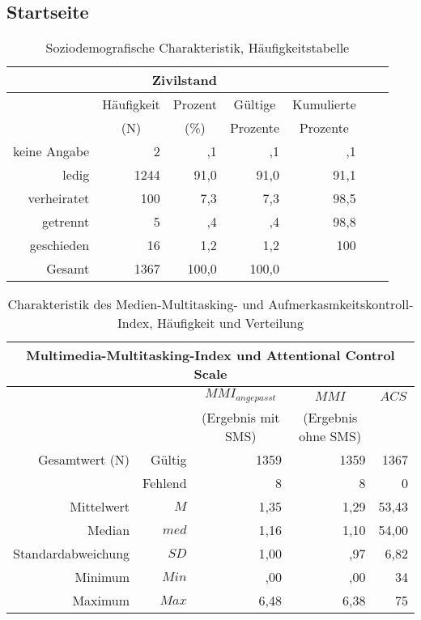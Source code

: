 \begin{RaggedRight}
\section{Startseite}\label{anhangSesction.Startseite}
\begin{table}[ht] 
    \centering
    \caption{Soziodemografische Charakteristik, Häufigkeitstabelle}
    \begin{tabular}[t]{|r|r|r|r|r|r|r|} 
        \hline
        \multicolumn{5}{|c|}{\textbf{Zivilstand}}\\ 
        \hline       
        \multicolumn{1}{|c}{} & \multicolumn{1}{c|}{Häufigkeit} & \multicolumn{1}{|c|}{Prozent} & \multicolumn{1}{|c|}{Gültige} & \multicolumn{1}{|c|}{Kumulierte}\\
        \multicolumn{1}{|c}{} & \multicolumn{1}{c|}{(N)} & \multicolumn{1}{|c|}{(\%)} & \multicolumn{1}{|c|}{Prozente} & \multicolumn{1}{|c|}{Prozente} \\
        \hline
        keine Angabe & 2 & ,1 & ,1 & ,1\\
        ledig & 1244 & 91,0 & 91,0 & 91,1\\
        verheiratet & 100 & 7,3 & 7,3 & 98,5\\
        getrennt & 5 & ,4 & ,4 & 98,8\\
        geschieden & 16 & 1,2 & 1,2 & 100\\
        Gesamt  & 1367 & 100,0 & 100,0 & \\
        \hline
    \end{tabular}
    \label{table.sozidemoZivil}
\end{table}
\begin{table}[ht] 
    \centering
    \caption{Charakteristik des Medien-Multitasking- und Aufmerkasmkeitskontroll-Index, Häufigkeit und Verteilung}
    \begin{tabular}[t]{|r r|r|r|r|} 
        \hline
        \multicolumn{5}{|c|}{\textbf{Multimedia-Multitasking-Index und Attentional Control Scale}}\\ 
        \hline       
        \multicolumn{2}{|c}{} & \multicolumn{1}{c|}{$MMI_{angepasst}$} & \multicolumn{1}{|c|}{$MMI$}& \multicolumn{1}{c|}{$ACS$}\\
        \multicolumn{2}{|c}{} & \multicolumn{1}{c|}{(Ergebnis mit SMS)} & \multicolumn{1}{|c|}{(Ergebnis ohne SMS)}& \multicolumn{1}{c|}{}\\
        \hline
        Gesamtwert (N) & Gültig & 1359 & 1359 & 1367\\
        & Fehlend & 8 & 8 & 0\\
        Mittelwert & $M$ & 1,35 & 1,29 & 53,43\\
        Median & $med$ & 1,16 & 1,10 & 54,00\\
        Standardabweichung & $SD$ & 1,00 & ,97 & 6,82\\
        Minimum & $Min$ & ,00 & ,00 & 34\\
        Maximum & $Max$ & 6,48 & 6,38 & 75\\
        \hline
    \end{tabular}
    \label{table.deskrptMedienAcs}
\end{table}
\end{RaggedRight}
